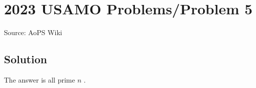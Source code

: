 \documentclass[12pt]{article}
\begin{document}
\section*{{2023 USAMO Problems/Problem 5}}
Source: AoPS Wiki

\subsection*{Solution}
The answer is all $\boxed{\text{prime } n}$ .
\end{document}
